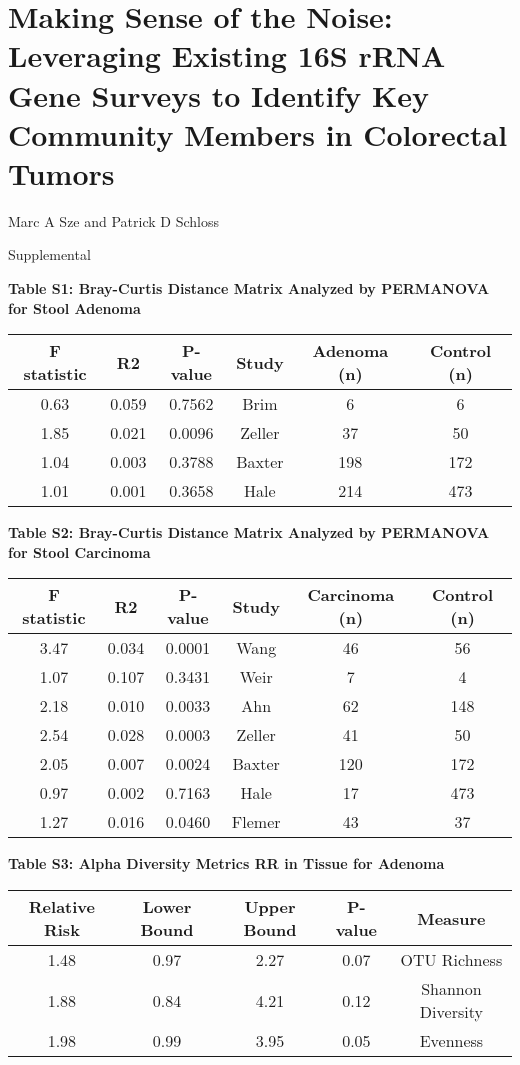 \documentclass[12pt,]{article}
\title{}
\author{}
\date{}
\begin{document}
\section{Making Sense of the Noise: Leveraging Existing 16S rRNA Gene
Surveys to Identify Key Community Members in Colorectal
Tumors}\label{making-sense-of-the-noise-leveraging-existing-16s-rrna-gene-surveys-to-identify-key-community-members-in-colorectal-tumors}

\vspace{10mm}

\begin{center}
Marc A Sze and Patrick D Schloss

\vspace{10mm}

Supplemental
\end{center}

\newpage

\textbf{Table S1: Bray-Curtis Distance Matrix Analyzed by PERMANOVA for
Stool Adenoma}

\begin{longtable}[]{@{}cccccc@{}}
\toprule
F statistic & R2 & P-value & Study & Adenoma (n) & Control
(n)\tabularnewline
\midrule
\endhead
0.63 & 0.059 & 0.7562 & Brim & 6 & 6\tabularnewline
1.85 & 0.021 & 0.0096 & Zeller & 37 & 50\tabularnewline
1.04 & 0.003 & 0.3788 & Baxter & 198 & 172\tabularnewline
1.01 & 0.001 & 0.3658 & Hale & 214 & 473\tabularnewline
\bottomrule
\end{longtable}

\newpage

\textbf{Table S2: Bray-Curtis Distance Matrix Analyzed by PERMANOVA for
Stool Carcinoma}

\begin{longtable}[]{@{}cccccc@{}}
\toprule
F statistic & R2 & P-value & Study & Carcinoma (n) & Control
(n)\tabularnewline
\midrule
\endhead
3.47 & 0.034 & 0.0001 & Wang & 46 & 56\tabularnewline
1.07 & 0.107 & 0.3431 & Weir & 7 & 4\tabularnewline
2.18 & 0.010 & 0.0033 & Ahn & 62 & 148\tabularnewline
2.54 & 0.028 & 0.0003 & Zeller & 41 & 50\tabularnewline
2.05 & 0.007 & 0.0024 & Baxter & 120 & 172\tabularnewline
0.97 & 0.002 & 0.7163 & Hale & 17 & 473\tabularnewline
1.27 & 0.016 & 0.0460 & Flemer & 43 & 37\tabularnewline
\bottomrule
\end{longtable}

\newpage

\textbf{Table S3: Alpha Diversity Metrics RR in Tissue for Adenoma}

\begin{longtable}[]{@{}ccccc@{}}
\toprule
Relative Risk & Lower Bound & Upper Bound & P-value &
Measure\tabularnewline
\midrule
\endhead
1.48 & 0.97 & 2.27 & 0.07 & OTU Richness\tabularnewline
1.88 & 0.84 & 4.21 & 0.12 & Shannon Diversity\tabularnewline
1.98 & 0.99 & 3.95 & 0.05 & Evenness\tabularnewline
\bottomrule
\end{longtable}
\end{document}
